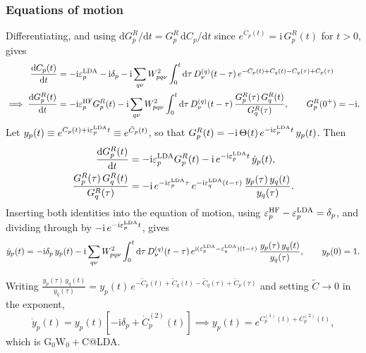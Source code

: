 \subsubsection{Equations of motion}
Differentiating, and using $\mathrm{d}G_p^R/\mathrm{d}t = G_p^R\,\mathrm{d}C_p/\mathrm{d}t$ since
$e^{C_p(t)} = \mathrm{i}\,G_p^R(t)$ for $t>0$, gives
\begin{align}
\frac{\mathrm{d}C_p(t)}{\mathrm{d}t} &= -\mathrm{i}\varepsilon_p^{\rm LDA} - \mathrm{i}\delta_p
  - \mathrm{i}\sum_{q\nu} W_{pq\nu}^2 \int_0^t \mathrm{d}\tau\,
  D^{(q)}_\nu(t-\tau)\, e^{-C_p(t)+C_q(t)-C_q(\tau)+C_p(\tau)} \\
\implies \frac{\mathrm{d}G_p^R(t)}{\mathrm{d}t} &= -\mathrm{i}\varepsilon_p^{\rm HF} G_p^R(t)
  - \mathrm{i}\sum_{q\nu} W_{pq\nu}^2 \int_0^t \mathrm{d}\tau\,
  D^{(q)}_\nu(t-\tau)\,\frac{G_p^R(\tau)\,G_q^R(t)}{G_q^R(\tau)},
  \qquad G_p^R(0^+)=-\mathrm{i} .
\end{align}
Let $y_p(t) \equiv e^{C_p(t)+\mathrm{i}\varepsilon_p^{\rm LDA} t} \equiv e^{\tilde C_p(t)}$, so that
$G_p^R(t) = -\mathrm{i}\,\Theta(t)\, e^{-\mathrm{i}\varepsilon_p^{\rm LDA} t}\, y_p(t)$. Then
\begin{align}
\frac{\mathrm{d}G_p^R(t)}{\mathrm{d}t}
  &= -\mathrm{i}\varepsilon_p^{\rm LDA} G_p^R(t) - \mathrm{i}\, e^{-\mathrm{i}\varepsilon_p^{\rm LDA} t}\,\dot y_p(t), \\
\frac{G_p^R(\tau)\,G_q^R(t)}{G_q^R(\tau)}
  &= -\mathrm{i}\, e^{-\mathrm{i}\varepsilon_p^{\rm LDA} \tau}\, e^{-\mathrm{i}\varepsilon_q^{\rm LDA} (t-\tau)}\,
     \frac{y_p(\tau)\,y_q(t)}{y_q(\tau)} .
\end{align}
Inserting both identities into the equation of motion, using $\varepsilon_p^{\rm HF}-\varepsilon_p^{\rm LDA}=\delta_p$, and dividing through by
$-\mathrm{i}\,e^{-\mathrm{i}\varepsilon_p^{\rm LDA} t}$, gives
\begin{equation}
\dot y_p(t) = -\mathrm{i}\delta_p\, y_p(t)
  - \mathrm{i}\sum_{q\nu} W_{pq\nu}^2 \int_0^t \mathrm{d}\tau\, D^{(q)}_\nu(t-\tau)\,
  e^{\mathrm{i}(\varepsilon_p^{\rm LDA}-\varepsilon_q^{\rm LDA})(t-\tau)}\,
  \frac{y_p(\tau)\,y_q(t)}{y_q(\tau)}, \qquad y_p(0)=1 .
\end{equation}
\begin{tcolorbox}
Writing
$\frac{y_p(\tau)\,y_q(t)}{y_q(\tau)} = y_p(t)\,
e^{-\tilde C_p(t)+\tilde C_q(t)-\tilde C_q(\tau)+\tilde C_p(\tau)}$ and setting $\tilde C\to0$ in the exponent,
\begin{equation}
\dot y_p(t) = y_p(t)\left[-\mathrm{i}\delta_p + \dot C_p^{(2)}(t)\right]
\implies y_p(t) = e^{C_p^{(1)}(t)+C_p^{(2)}(t)},
\end{equation}
which is $\mathrm{G_0W_0{+}C}$@LDA.
\end{tcolorbox}
